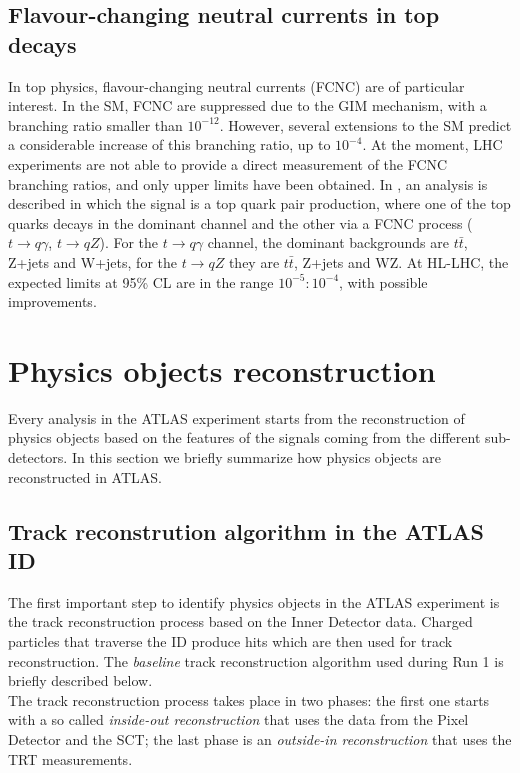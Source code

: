 \documentclass[a4paper,twoside,12pt]{article}
\begin{document}
\subsection{Flavour-changing neutral currents in top decays}
In top physics, flavour-changing neutral currents (FCNC) are of particular interest.
In the SM, FCNC are suppressed due to the GIM mechanism, with a branching ratio smaller
than $10^{-12}$. However, several extensions to the SM predict a considerable increase of this branching ratio, up to $10^{-4}$. At the moment, LHC experiments are not able to provide a direct measurement of the FCNC branching ratios, and only upper limits have been obtained. 
In \cite{loi}, an analysis is described in which the signal is a top quark pair production, where
one of the top quarks decays in the dominant channel and the other via a FCNC process 
($t \rightarrow q\gamma$, $t \rightarrow qZ$). For the $t \rightarrow q\gamma$ channel, 
the dominant backgrounds are $t\bar{t}$, Z+jets and W+jets, for the $t \rightarrow qZ$ they are $t\bar{t}$, Z+jets and WZ. At HL-LHC, the expected limits at 95\% CL are in the range
$10^{-5} : 10^{-4}$, with possible improvements. 

\clearpage

\section{Physics objects reconstruction}
Every analysis in the ATLAS experiment starts from the reconstruction of physics objects
based on the features of the signals coming from the different sub-detectors\cite{PhysicsObjectReconstruction}. In this section we briefly
summarize how physics objects are reconstructed in ATLAS.\\

\subsection{Track reconstrution algorithm in the ATLAS ID}
The first important step to identify physics objects in the ATLAS experiment is the track reconstruction process based on the Inner Detector data. Charged particles that
traverse the ID produce hits which are then used for track reconstruction. The \textit{baseline} track reconstruction
algorithm\cite{OptimizationTrackReconstructionAlgorithm} used during Run 1 is briefly described below.\\

The track reconstruction process takes place in two phases: the first one starts with a so called \textit{inside-out reconstruction} that uses the data from the Pixel Detector and the SCT; the last phase is an \textit{outside-in reconstruction} that uses the TRT measurements. \\
\end{document}
